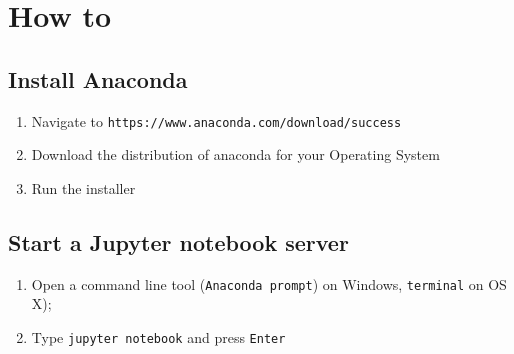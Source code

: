 \section{How to}

\subsection{Install Anaconda}

\begin{enumerate}

\item 

Navigate to \texttt{https://www.anaconda.com/download/success}

\item 

Download the distribution of anaconda for your Operating System

\item 

Run the installer

\end{enumerate}


\subsection{Start a Jupyter notebook server}


\begin{enumerate}

\item 

    Open a command line tool (\texttt{Anaconda prompt}) on Windows,
        \texttt{terminal} on OS X);

\item 

    Type \texttt{jupyter notebook} and press \texttt{Enter}

\end{enumerate}



